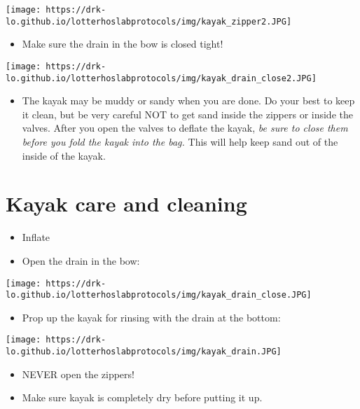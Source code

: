 \documentclass[
  letterpaper,
  DIV=11,
  numbers=noendperiod]{scrreprt}
\providecommand{\tightlist}{%
  \setlength{\itemsep}{0pt}\setlength{\parskip}{0pt}}\usepackage{longtable,booktabs,array}
\begin{document}
\texttt{[image: https://drk-lo.github.io/lotterhoslabprotocols/img/kayak\_zipper2.JPG]}

\begin{itemize}
\tightlist
\item
  Make sure the drain in the bow is closed tight!
\end{itemize}

\texttt{[image: https://drk-lo.github.io/lotterhoslabprotocols/img/kayak\_drain\_close2.JPG]}

\begin{itemize}
\tightlist
\item
  The kayak may be muddy or sandy when you are done. Do your best to
  keep it clean, but be very careful NOT to get sand inside the zippers
  or inside the valves. After you open the valves to deflate the kayak,
  \emph{be sure to close them before you fold the kayak into the bag.}
  This will help keep sand out of the inside of the kayak.
\end{itemize}

\hypertarget{kayak-care-and-cleaning}{%
\section*{\texorpdfstring{\textbf{Kayak care and
cleaning}}{Kayak care and cleaning}}\label{kayak-care-and-cleaning}}


\begin{itemize}
\item
  Inflate
\item
  Open the drain in the bow:
\end{itemize}

\texttt{[image: https://drk-lo.github.io/lotterhoslabprotocols/img/kayak\_drain\_close.JPG]}

\begin{itemize}
\tightlist
\item
  Prop up the kayak for rinsing with the drain at the bottom:
\end{itemize}

\texttt{[image: https://drk-lo.github.io/lotterhoslabprotocols/img/kayak\_drain.JPG]}

\begin{itemize}
\item
  NEVER open the zippers!
\item
  Make sure kayak is completely dry before putting it up.
\end{itemize}
\end{document}

